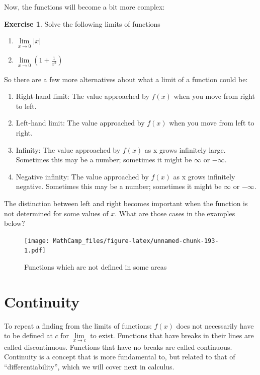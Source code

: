 \documentclass[
]{book}
\providecommand{\tightlist}{%
  \setlength{\itemsep}{0pt}\setlength{\parskip}{0pt}}
\theoremstyle{definition}
\theoremstyle{definition}
\theoremstyle{definition}
\newtheorem{exercise}{Exercise}[chapter]
\theoremstyle{definition}
\theoremstyle{remark}
\begin{document}
Now, the functions will become a bit more complex:

\begin{exercise}
\protect\hypertarget{exr:discontlim}{}{\label{exr:discontlim} }Solve the following limits of functions

\begin{enumerate}
\def\labelenumi{\arabic{enumi}.}
\tightlist
\item
  \(\lim\limits_{x\to 0} |x|\)
\item
  \(\lim\limits_{x\to 0} \left(1+\frac{1}{x^2}\right)\)
\end{enumerate}
\end{exercise}

So there are a few more alternatives about what a limit of a function could be:

\begin{enumerate}
\def\labelenumi{\arabic{enumi}.}
\tightlist
\item
  Right-hand limit: The value approached by \(f(x)\) when you move from right to left.
\item
  Left-hand limit: The value approached by \(f(x)\) when you move from left to right.
\item
  Infinity: The value approached by \(f(x)\) as x grows infinitely large. Sometimes this may be a number; sometimes it might be \(\infty\) or \(-\infty\).
\item
  Negative infinity: The value approached by \(f(x)\) as x grows infinitely negative. Sometimes this may be a number; sometimes it might be \(\infty\) or \(-\infty\).
\end{enumerate}

The distinction between left and right becomes important when the function is not determined for some values of \(x\). What are those cases in the examples below?

\begin{figure}
\centering
\texttt{[image: MathCamp\_files/figure-latex/unnamed-chunk-193-1.pdf]}
\caption{\label{fig:unnamed-chunk-193}Functions which are not defined in some areas}
\end{figure}

\hypertarget{continuity}{%
\section{Continuity}\label{continuity}}

To repeat a finding from the limits of functions: \(f(x)\) does not necessarily have to be defined at \(c\) for \(\lim\limits_{x \to c}\) to exist. Functions that have breaks in their lines are called discontinuous. Functions that have no breaks are called continuous. Continuity is a concept that is more fundamental to, but related to that of ``differentiability'', which we will cover next in calculus.
\end{document}
